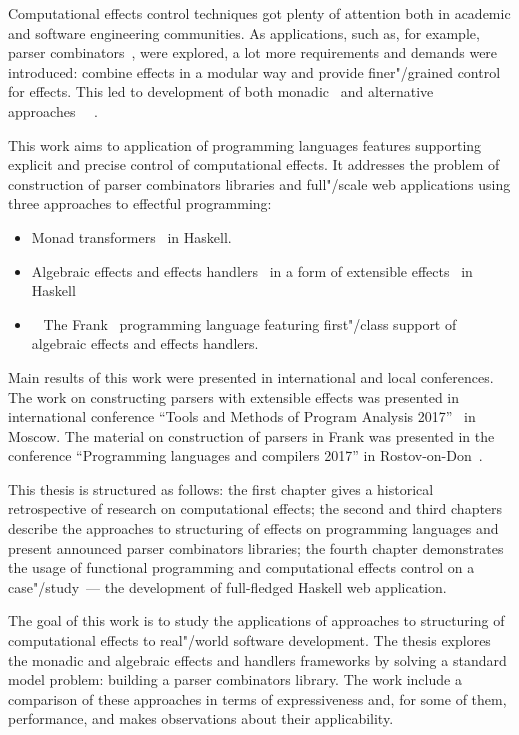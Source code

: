 Computational effects control techniques got plenty of attention both in academic and
software engineering communities. As applications, such as, for example, parser
combinators~\cite{monParsing}, were explored, a lot more requirements and demands
were introduced: combine effects in a modular way and provide finer"/grained control
for effects. This led to development of both monadic~\cite{Liang:1995:MTM:199448.199528} and
alternative approaches~\cite{Mcbride:2008:APE:1348940.1348941}
~\cite{DBLP:journals/jlp/BauerP15}.

This work aims to application of programming languages features supporting explicit
and precise control of computational effects. It addresses the problem
of construction of parser combinators libraries and full"/scale web applications
using three approaches to effectful programming:

\begin{itemize}
  \item Monad transformers~\cite{Liang:1995:MTM:199448.199528} in Haskell.
  \item Algebraic effects and effects handlers~\cite{DBLP:journals/jlp/BauerP15}
  in a form of extensible effects~\cite{Kiselyov:2013:EEA:2578854.2503791} in Haskell
  \item~ The Frank~\cite{DBLP:conf/popl/LindleyMM17} programming language featuring
  first"/class support of algebraic effects and effects handlers.
\end{itemize}

Main results of this work were presented in international and local conferences.
The work on constructing parsers with extensible effects was presented in 
international conference ``Tools and Methods of Program Analysis 2017''~\cite{tmpaExtEffects}
in Moscow. The material on construction of parsers in Frank was presented in the
conference ``Programming languages and compilers 2017'' in Rostov-on-Don~\cite{plcFrank}.

This thesis is structured as follows: the first chapter gives a historical retrospective
of research on computational effects; the second and third chapters describe the
approaches to structuring of effects on programming languages and present announced parser combinators libraries; the fourth chapter demonstrates the usage of functional programming
and computational effects control on a case"/study~--- the development of full-fledged
Haskell web application.

\Goal

The goal of this work is to study the applications of approaches to structuring
of computational effects to real"/world software development. The thesis explores
the monadic and algebraic effects and handlers frameworks by solving a
standard model problem: building a parser combinators library. The work
include a comparison of these approaches in terms of expressiveness and, for some of them,
performance, and makes observations about their applicability.

